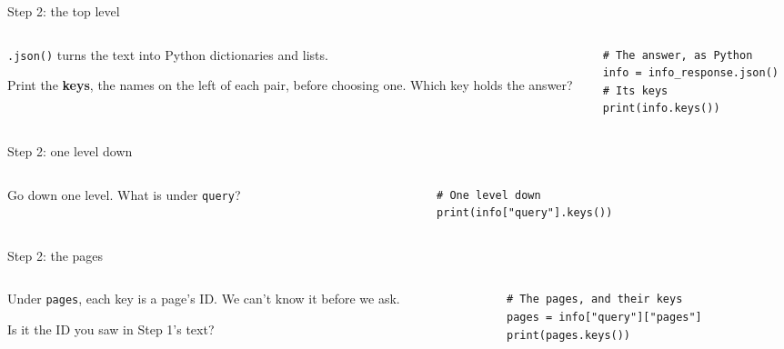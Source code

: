 \documentclass[9pt,aspectratio=169]{beamer}
\begin{document}
\begin{frame}[fragile]{Step 2: the top level}
    \begin{columns}[T]
        \begin{column}{0.37\textwidth}
            \texttt{.json()} turns the text into Python dictionaries and lists.

            \medskip
            Print the \textbf{keys}, the names on the left of each pair, before choosing one. Which key holds the answer?
        \end{column}
        \begin{column}{0.6\textwidth}
\begin{lstlisting}
# The answer, as Python
info = info_response.json()
# Its keys
print(info.keys())
\end{lstlisting}
        \end{column}
    \end{columns}
\end{frame}

\begin{frame}[fragile]{Step 2: one level down}
    \begin{columns}[T]
        \begin{column}{0.37\textwidth}
            Go down one level. What is under \texttt{query}?
        \end{column}
        \begin{column}{0.6\textwidth}
\begin{lstlisting}
# One level down
print(info["query"].keys())
\end{lstlisting}
        \end{column}
    \end{columns}
\end{frame}

\begin{frame}[fragile]{Step 2: the pages}
    \begin{columns}[T]
        \begin{column}{0.37\textwidth}
            Under \texttt{pages}, each key is a page's ID. We can't know it before we ask.

            \medskip
            Is it the ID you saw in Step 1's text?
        \end{column}
        \begin{column}{0.6\textwidth}
\begin{lstlisting}
# The pages, and their keys
pages = info["query"]["pages"]
print(pages.keys())
\end{lstlisting}
        \end{column}
    \end{columns}
\end{frame}
\end{document}
